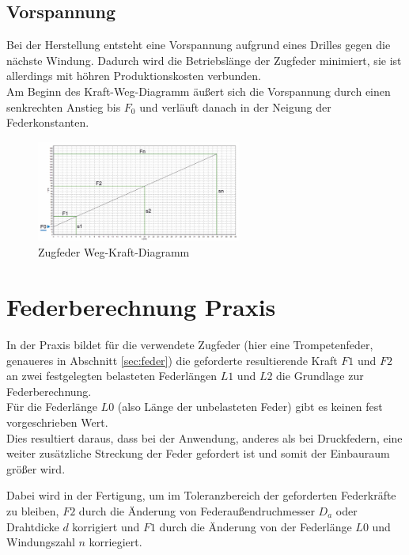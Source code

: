 \subsection{Vorspannung}
Bei der Herstellung entsteht eine Vorspannung aufgrund eines Drilles gegen die nächste
Windung. Dadurch wird die Betriebslänge der Zugfeder minimiert, sie ist allerdings mit höhren Produktionskosten
verbunden.\\
Am Beginn des Kraft-Weg-Diagramm äußert sich die Vorspannung durch einen senkrechten Anstieg
bis $F_0$ und verläuft danach in der Neigung der Federkonstanten.  
\begin{figure}[H]
    \centering
    \includegraphics[width=0.6\textwidth]{bilder/Input/Vorspannung.jpg}
    \caption{Zugfeder Weg-Kraft-Diagramm \cite{KompZ}}
\end{figure}
\newpage
\section{Federberechnung Praxis}

    In der Praxis bildet für die verwendete Zugfeder (hier eine Trompetenfeder, genaueres in Abschnitt \ref{sec:feder})
    die geforderte resultierende Kraft $F1$ und $F2$ an zwei festgelegten belasteten Federlängen $L1$ und $L2$
    die Grundlage zur Federberechnung.\\

    Für die Federlänge $L0$ (also Länge der unbelasteten Feder) gibt es keinen fest vorgeschrieben Wert.\\
    Dies resultiert daraus, dass bei der Anwendung, anderes als bei Druckfedern, eine weiter zusätzliche Streckung
    der Feder gefordert ist und somit der Einbauraum größer wird.\newline

    Dabei wird in der Fertigung, um im Toleranzbereich der geforderten Federkräfte zu bleiben, $F2$ durch
    die Änderung von Federaußendruchmesser $D_a$ oder Drahtdicke $d$ korrigiert und $F1$  durch die Änderung
    von der Federlänge $L0$ und Windungszahl $n$ korriegiert.\\

